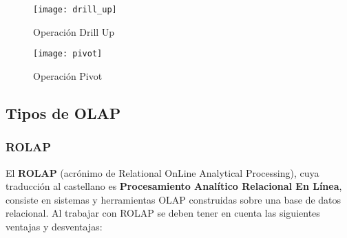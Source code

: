 \documentclass[a4paper,11pt]{article}
\begin{document}
\begin{flushleft}
    \begin{figure}
      \begin{center}
        \texttt{[image: drill\_up]}
        \caption{Operación Drill Up} \cite{operaciones}
        \label{drill_up}
      \end{center}
    \end{figure}
    
    \begin{figure}
      \begin{center}
        \texttt{[image: pivot]}
        \caption{Operación Pivot} \cite{operaciones}
        \label{pivot}
      \end{center}
    \end{figure}
    
    
    \vspace{0.3in}
    \subsection{Tipos de OLAP}
    
    \subsubsection{ROLAP}
    
    El \textbf{ROLAP} (acrónimo de Relational OnLine Analytical Processing), cuya traducción al castellano es \textbf{Procesamiento Analítico
    Relacional En Línea}, consiste en sistemas y herramientas OLAP construidas sobre una base de datos relacional. Al trabajar con ROLAP se deben
    tener en cuenta las siguientes ventajas y desventajas:
    

\end{flushleft}
\end{document}
